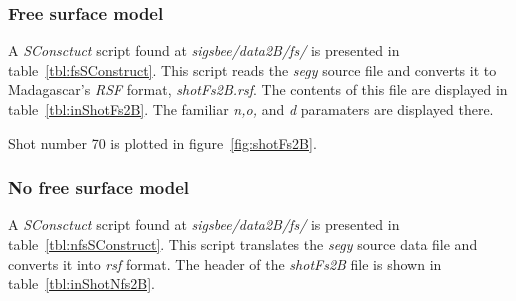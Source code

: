 \subsubsection{Free surface model}  
A \emph{SConsctuct} script found at \textit{sigsbee/data2B/fs/} is presented in table~\ref{tbl:fsSConstruct}.  This script reads the \emph{segy} source file and converts it to Madagascar's \emph{RSF} format, \emph{shotFs2B.rsf}.  The contents of this file are displayed in table~\ref{tbl:inShotFs2B}.  The familiar \emph{n,o,} and \emph{d} paramaters are displayed there.  

{
\tiny

\normalsize
}

{
\tiny

\normalsize
}
Shot number 70 is plotted in figure~\ref{fig:shotFs2B}.   


\subsubsection{No free surface model}
A \emph{SConsctuct} script found at \textit{sigsbee/data2B/fs/} is presented in table~\ref{tbl:nfsSConstruct}.  This script translates the \emph{segy} source data file and converts it into \emph{rsf} format.  The header of the \emph{shotFs2B} file is shown in table~\ref{tbl:inShotNfs2B}. 

{
\tiny

\normalsize
}
{
\tiny

}

